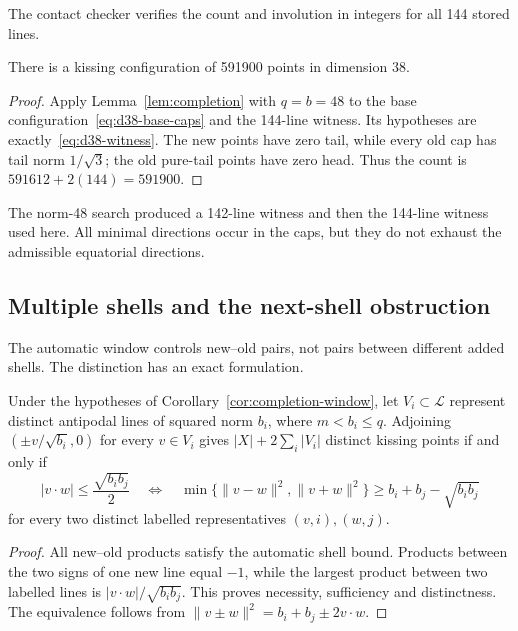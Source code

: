 The contact checker verifies the count and involution in integers
for all 144 stored lines.

\begin{theorem}\label{thm:d38}
There is a kissing configuration of 591900 points in dimension 38.
\end{theorem}
\begin{proof}
Apply Lemma~\ref{lem:completion} with $q=b=48$ to the base
configuration~\eqref{eq:d38-base-caps} and the 144-line witness.
Its hypotheses are exactly~\eqref{eq:d38-witness}. The new points
have zero tail, while every old cap has tail norm $1/\sqrt3$;
the old pure-tail points have zero head. Thus the count is
$591612+2(144)=591900$.
\end{proof}

The norm-48 search produced a 142-line witness and then the 144-line
witness used here. All minimal directions occur in the caps, but
they do not exhaust the admissible equatorial directions.

\subsection{Multiple shells and the next-shell obstruction}
The automatic window controls new--old pairs, not pairs between
different added shells. The distinction has an exact formulation.

\begin{proposition}\label{prop:multi-shell}
Under the hypotheses of Corollary~\ref{cor:completion-window}, let
$V_i\subset\mathcal L$ represent distinct antipodal lines of squared norm $b_i$, where
$m<b_i\le q$. Adjoining $(\pm v/\sqrt{b_i},0)$ for every $v\in V_i$
gives $|X|+2\sum_i|V_i|$ distinct kissing points if and only if
\begin{equation}\label{eq:multi-shell-separation}
 |v\cdot w|\le\frac{\sqrt{b_i b_j}}2
 \quad\Longleftrightarrow\quad
 \min\{\|v-w\|^2,\|v+w\|^2\}\ge b_i+b_j-\sqrt{b_i b_j}
\end{equation}
for every two distinct labelled representatives $(v,i),(w,j)$.
\end{proposition}
\begin{proof}
All new--old products satisfy the automatic shell bound. Products
between the two signs of one new line equal $-1$, while the largest
product between two labelled lines is $|v\cdot w|/\sqrt{b_i b_j}$.
This proves necessity, sufficiency and distinctness. The equivalence
follows from $\|v\pm w\|^2=b_i+b_j\pm2v\cdot w$.
\end{proof}

